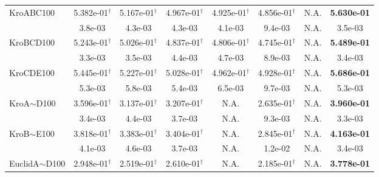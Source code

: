 {\begin{longtable}[c]{lccccccc}
    KroABC100             & 5.382e-01$^{\dag}$ & 5.167e-01$^{\dag}$ & 4.967e-01$^{\dag}$ & 4.925e-01$^{\dag}$ & 4.856e-01$^{\dag}$ & N.A.                 & \textbf{5.630e-01} \\
                                            & 3.8e-03            & 4.3e-03            & 4.3e-03            & 4.1e-03            & 9.4e-03            & N.A.                        & 3.5e-03            \\
    \midrule
    KroBCD100            & 5.243e-01$^{\dag}$ & 5.026e-01$^{\dag}$ & 4.837e-01$^{\dag}$ & 4.806e-01$^{\dag}$ & 4.745e-01$^{\dag}$ & N.A.                  & \textbf{5.489e-01} \\
                                            & 3.3e-03            & 3.5e-03            & 4.4e-03            & 4.7e-03            & 8.9e-03            & N.A.                           & 3.4e-03            \\
    \midrule
    KroCDE100             & 5.445e-01$^{\dag}$ & 5.227e-01$^{\dag}$ & 5.028e-01$^{\dag}$ & 4.962e-01$^{\dag}$ & 4.928e-01$^{\dag}$ & N.A.                & \textbf{5.686e-01} \\
                                            & 5.3e-03            & 5.8e-03            & 5.4e-03            & 6.5e-03            & 9.7e-03            & N.A.                           & 5.3e-03            \\
    \midrule
    KroA$\sim$D100          & 3.596e-01$^{\dag}$ & 3.137e-01$^{\dag}$ & 3.207e-01$^{\dag}$ & N.A.               & 2.635e-01$^{\dag}$ & N.A.                 & \textbf{3.960e-01} \\
                                            & 3.4e-03            & 4.4e-03            & 3.7e-03            & N.A.               & 9.3e-03            & N.A.                            & 3.3e-03            \\
    \midrule
    KroB$\sim$E100         & 3.818e-01$^{\dag}$ & 3.383e-01$^{\dag}$ & 3.404e-01$^{\dag}$ & N.A.               & 2.845e-01$^{\dag}$ & N.A.                  & \textbf{4.163e-01} \\
                                            & 4.1e-03            & 4.6e-03            & 3.7e-03            & N.A.               & 1.2e-02            & N.A.                           & 3.4e-03            \\
    \midrule
    EuclidA$\sim$D100        & 2.948e-01$^{\dag}$ & 2.519e-01$^{\dag}$ & 2.610e-01$^{\dag}$ & N.A.               & 2.185e-01$^{\dag}$ & N.A.                 & \textbf{3.778e-01} \\

\end{longtable}}
